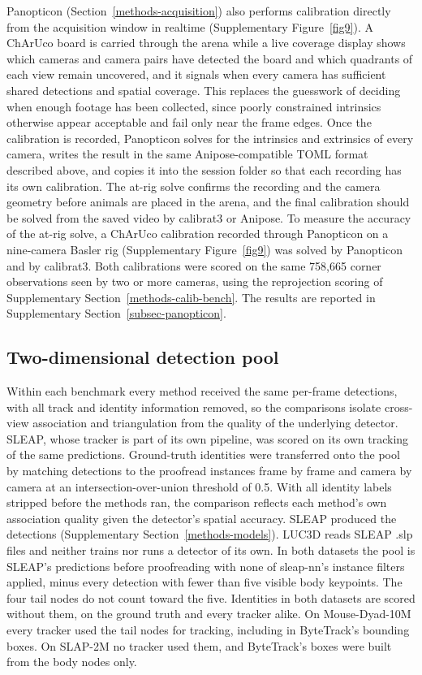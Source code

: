 \documentclass[pdflatex, sn-nature]{sn-jnl}
\theoremstyle{thmstyleone}%
\theoremstyle{thmstyletwo}%
\theoremstyle{thmstylethree}%
\begin{document}
Panopticon (Section~\ref{methods-acquisition}) also performs calibration directly from the acquisition window in realtime (Supplementary Figure~\ref{fig9}). A ChArUco board is carried through the arena while a live coverage display shows which cameras and camera pairs have detected the board and which quadrants of each view remain uncovered, and it signals when every camera has sufficient shared detections and spatial coverage. This replaces the guesswork of deciding when enough footage has been collected, since poorly constrained intrinsics otherwise appear acceptable and fail only near the frame edges. Once the calibration is recorded, Panopticon solves for the intrinsics and extrinsics of every camera, writes the result in the same Anipose-compatible TOML format described above, and copies it into the session folder so that each recording has its own calibration. The at-rig solve confirms the recording and the camera geometry before animals are placed in the arena, and the final calibration should be solved from the saved video by calibrat3 or Anipose. To measure the accuracy of the at-rig solve, a ChArUco calibration recorded through Panopticon on a nine-camera Basler rig (Supplementary Figure~\ref{fig9}) was solved by Panopticon and by calibrat3. Both calibrations were scored on the same 758,665 corner observations seen by two or more cameras, using the reprojection scoring of Supplementary Section~\ref{methods-calib-bench}. The results are reported in Supplementary Section~\ref{subsec-panopticon}.

\subsection{Two-dimensional detection pool}\label{methods-pool}

Within each benchmark every method received the same per-frame detections, with all track and identity information removed, so the comparisons isolate cross-view association and triangulation from the quality of the underlying detector. SLEAP, whose tracker is part of its own pipeline, was scored on its own tracking of the same predictions. Ground-truth identities were transferred onto the pool by matching detections to the proofread instances frame by frame and camera by camera at an intersection-over-union threshold of 0.5. With all identity labels stripped before the methods ran, the comparison reflects each method's own association quality given the detector's spatial accuracy. SLEAP produced the detections (Supplementary Section~\ref{methods-models}). LUC3D reads SLEAP .slp files and neither trains nor runs a detector of its own. In both datasets the pool is SLEAP's predictions before proofreading with none of sleap-nn's instance filters applied, minus every detection with fewer than five visible body keypoints. The four tail nodes do not count toward the five. Identities in both datasets are scored without them, on the ground truth and every tracker alike. On Mouse-Dyad-10M every tracker used the tail nodes for tracking, including in ByteTrack's bounding boxes. On SLAP-2M no tracker used them, and ByteTrack's boxes were built from the body nodes only.
\end{document}
